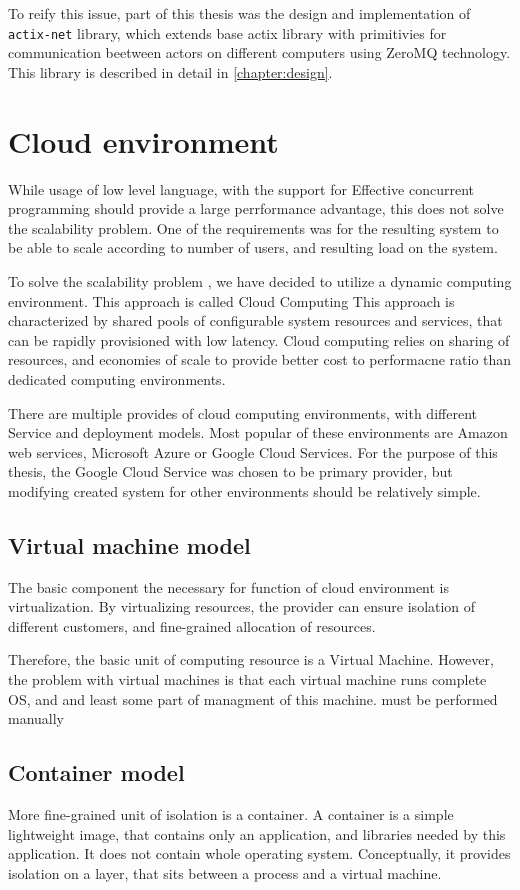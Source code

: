 To reify this issue, part of this thesis was the design and implementation of \verb|actix-net| library, which extends
base actix library with primitivies for communication beetween actors on different computers using ZeroMQ technology.
This library is described in detail in \autoref{chapter:design}.

\section{Cloud environment}
While usage of low level language, with the support for Effective concurrent programming should provide a large perrformance
advantage, this does not solve the scalability problem. One of the requirements was for the resulting system to
be able to scale according to number of users, and resulting load on the system.

To solve the scalability problem , we have decided to utilize a dynamic computing environment. This approach is called Cloud Computing\cite{wiki:cloud}
This approach is characterized by shared pools of configurable system resources and services, that can be rapidly provisioned
with low latency. Cloud computing relies on sharing of resources, and economies of scale to provide better
cost to performacne ratio than dedicated computing environments.

There are multiple provides of cloud computing environments, with different Service and deployment models.
Most popular of these environments are Amazon web services, Microsoft Azure or Google Cloud Services. For the purpose of
this thesis, the Google Cloud Service was chosen to be primary provider, but modifying created system for other
environments should be relatively simple.

\subsection{Virtual machine model}
The basic component the necessary for function of cloud environment is virtualization. By virtualizing resources,
the provider can ensure isolation of different customers, and fine-grained allocation of resources.

Therefore, the basic unit of computing resource is a Virtual Machine. However, the problem with virtual machines
is that each virtual machine runs complete OS, and and least some part of managment of this machine.
must be performed manually

\subsection{Container model}
More fine-grained unit of isolation is a container. A container is a simple lightweight image, that contains
only an application, and libraries needed by this application. It does not contain whole operating system.
Conceptually, it provides isolation on a layer, that sits between a process and a virtual machine.

